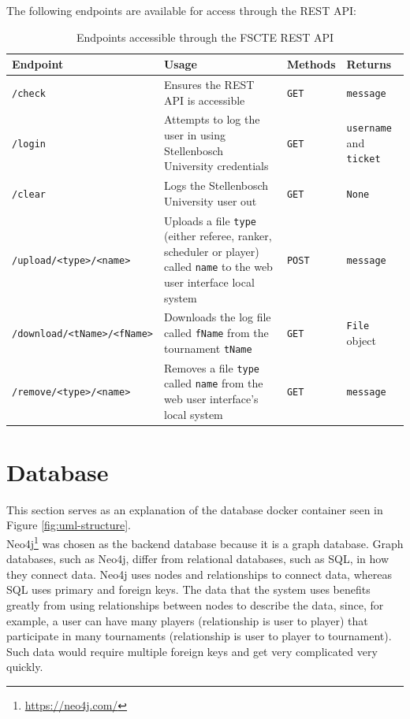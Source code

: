 \documentclass[a4paper, 11pt]{report}
\begin{document}
The following endpoints are available for access through the REST API:
\begin{table}[H]
	\begin{adjustwidth}{-.5in}{-.5in}
		\centering
		\begin{tabular}{|m{5cm}|m{6cm}|m{1.7cm}|m{1.95cm}|}
			\hline
			\textbf{Endpoint} & \textbf{Usage} & \textbf{Methods} & \textbf{Returns} \\
			\hline
			\texttt{/check} & Ensures the REST API is accessible & \texttt{GET} & \texttt{message} \\
			\hline
			\texttt{/login} & Attempts to log the user in using Stellenbosch University credentials & \texttt{GET} & \texttt{username} and \texttt{ticket} \\
			\hline
			\texttt{/clear} & Logs the Stellenbosch University user out & \texttt{GET} & \texttt{None} \\
			\hline
			\texttt{/upload/<type>/<name>} & Uploads a file \texttt{type} (either referee, ranker, scheduler or player) called \texttt{name} to the web user interface local system & \texttt{POST} & \texttt{message} \\
			\hline
			\texttt{/download/<tName>/<fName>} & Downloads the log file called \texttt{fName} from the tournament \texttt{tName} & \texttt{GET} & \texttt{File} object \\
			\hline
			\texttt{/remove/<type>/<name>} & Removes a file \texttt{type} called \texttt{name} from the web user interface's local system & \texttt{GET} & \texttt{message} \\
			\hline
		\end{tabular}
		\caption{Endpoints accessible through the FSCTE REST API}
		\label{tab:enpoints}
	\end{adjustwidth}
\end{table}

\section{Database}

This section serves as an explanation of the database docker container seen in
Figure \ref{fig:uml-structure}. \\

Neo4j\footnote{\url{https://neo4j.com/}} was chosen as the backend database
because it is a graph database. Graph databases, such as Neo4j, differ from
relational databases, such as SQL, in how they connect data. Neo4j uses nodes
and relationships to connect data, whereas SQL uses primary and foreign keys.
The data that the system uses benefits greatly from using relationships between
nodes to describe the data, since, for example, a user can have many players
(relationship is user to player) that participate in many tournaments (relationship
is user to player to tournament). Such data would require multiple foreign keys
and get very complicated very quickly. \\
\end{document}
